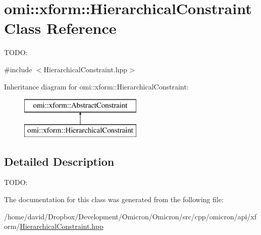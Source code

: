 \hypertarget{classomi_1_1xform_1_1_hierarchical_constraint}{}\section{omi\+:\+:xform\+:\+:Hierarchical\+Constraint Class Reference}
\label{classomi_1_1xform_1_1_hierarchical_constraint}


T\+O\+DO\+:  




{\ttfamily \#include $<$Hierarchical\+Constraint.\+hpp$>$}

Inheritance diagram for omi\+:\+:xform\+:\+:Hierarchical\+Constraint\+:\begin{figure}[H]
\begin{center}
\leavevmode
\includegraphics[height=2.000000cm]{classomi_1_1xform_1_1_hierarchical_constraint}
\end{center}
\end{figure}


\subsection{Detailed Description}
T\+O\+DO\+: 

The documentation for this class was generated from the following file\+:\begin{DoxyCompactItemize}
\item 
/home/david/\+Dropbox/\+Development/\+Omicron/\+Omicron/src/cpp/omicron/api/xform/\hyperlink{_hierarchical_constraint_8hpp}{Hierarchical\+Constraint.\+hpp}\end{DoxyCompactItemize}

